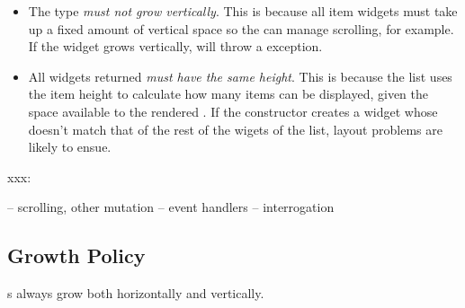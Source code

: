 \begin{itemize}
\item The  type \textit{must not grow vertically}.  This
  is because all  item widgets must take up a fixed amount of
  vertical space so the  can manage scrolling, for example.
  If the widget grows vertically,  will throw a
   exception.
\item All widgets returned \textit{must have the same height}.  This
  is because the list uses the item height to calculate how many items
  can be displayed, given the space available to the rendered
  .  If the constructor creates a widget whose doesn't match
  that of the rest of the wigets of the list, layout problems are
  likely to ensue.
\end{itemize}

xxx:

-- scrolling, other mutation
-- event handlers
-- interrogation

\subsection{Growth Policy}

s always grow both horizontally and vertically.
